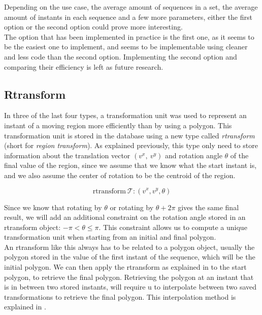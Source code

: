 Depending on the use case, the average amount of sequences in a set, the average amount of instants in each sequence and a few more parameters, either the first option or the second option could prove more interesting. \\

The option that has been implemented in practice is the first one, as it seems to be the easiest one to implement, and seems to be implementable using cleaner and less code than the second option. Implementing the second option and comparing their efficiency is left as future research.

\subsection{Rtransform}

In three of the last four types, a transformation unit was used to represent an instant of a moving region more efficiently than by using a polygon. This transformation unit is stored in the database using a new type called \textit{rtransform} (short for \textit{region transform}). As explained previously, this type only need to store information about the translation vector $(v^x,\ v^y)$ and rotation angle $\theta$ of the final value of the region, since we assume that we know what the start instant is, and we also assume the center of rotation to be the centroid of the region.

\[
    \text{rtransform}\ \mathcal{T}: (v^x, v^y, \theta)
\]

Since we know that rotating by $\theta$ or rotating by $\theta + 2\pi$ gives the same final result, we will add an additional constraint on the rotation angle stored in an rtransform object: $-\pi < \theta \le \pi$. This constraint allows us to compute a unique transformation unit when starting from an initial and final polygon. \\

An rtransform like this always has to be related to a polygon object, usually the polygon stored in the value of the first instant of the sequence, which will be the initial polygon. We can then apply the rtransform as explained in  to the start polygon, to retrieve the final polygon. Retrieving the polygon at an instant that is in between two stored instants, will require u to interpolate between two saved transformations to retrieve the final polygon. This interpolation method is explained in .

